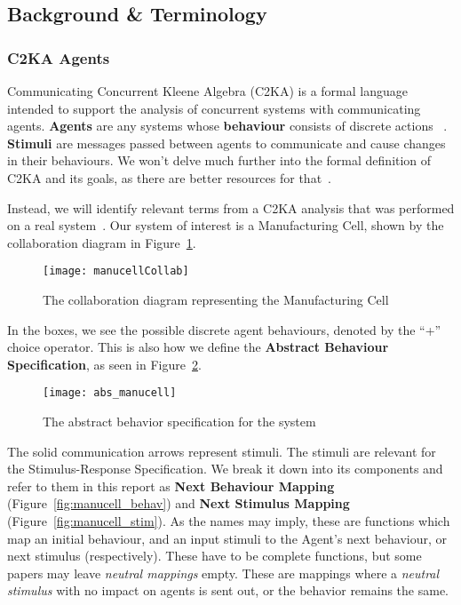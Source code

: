 \subsection{Background \& Terminology}\label{subsec:background-&-terminology}
\subsubsection{C2KA Agents}\label{subsubsec:c2ka-agents}
Communicating Concurrent Kleene Algebra (C2KA) is a formal language intended to support the analysis of concurrent systems with communicating agents. %
\textbf{Agents} are any systems whose \textbf{behaviour} consists of discrete actions ~\cite{c2ka_foundations}.
\textbf{Stimuli} are messages passed between agents to communicate and cause changes in their behaviours.
We won't delve much further into the formal definition of C2KA and its goals,
as there are better resources for that~\cite{c2ka_foundations, implicit_interactions}.

Instead, we will identify relevant terms from a C2KA analysis that was performed on a real system~\cite{manu_cell}.
Our system of interest is a Manufacturing Cell, shown by the collaboration diagram in Figure~\ref{fig:manucell-collab}.
\begin{figure}
    \centering
    \texttt{[image: manucellCollab]}
    \caption{The collaboration diagram representing the Manufacturing Cell~\cite{manu_cell}}
    \label{fig:manucell-collab}
\end{figure}

In the boxes, we see the possible discrete agent behaviours, denoted by the ``+'' choice operator.
This is also how we define the \textbf{Abstract Behaviour Specification}, as seen in Figure~\ref{fig:abstractmc}.
\begin{figure}
    \centering
    \texttt{[image: abs\_manucell]}
    \caption{The abstract behavior specification for the system~\cite{manu_cell}}
    \label{fig:abstractmc}
\end{figure}

The solid communication arrows represent stimuli.
The stimuli are relevant for the Stimulus-Response Specification.
We break it down into its components and refer to them in this report as \textbf{Next Behaviour Mapping} (Figure~\ref{fig:manucell_behav})
and \textbf{Next Stimulus Mapping} (Figure~\ref{fig:manucell_stim}).
As the names may imply, these are functions which map an initial behaviour, and an input stimuli to the Agent's next behaviour, or next stimulus (respectively).
These have to be complete functions, but some papers may leave \textit{neutral mappings} empty.
These are mappings where a \textit{neutral stimulus} with no impact on agents is sent out, or the behavior remains the same.

